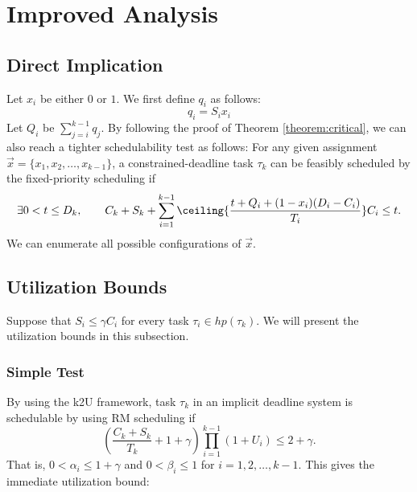 \section{Improved Analysis}

\subsection{Direct Implication}

Let $x_i$ be either $0$ or $1$. We first define $q_i$ as follows:
\begin{equation}
  \label{eq:qi}
  q_i = S_i x_i
\end{equation}
Let $Q_i$ be $\sum_{j=i}^{k-1} q_j$.  
By following the proof of Theorem \ref{theorem:critical}, we can also reach a tighter schedulability test as follows: For any given assignment $\vec{x} = \{x_1, x_2, \ldots, x_{k-1}\}$, a constrained-deadline task $\tau_k$ can be feasibly scheduled by the fixed-priority scheduling if
\begin{equation} \label{eq:TDA-suspension-tighter} 
\exists 0 < t \leq D_k, \qquad C_k+S_k+ \sum_{i=1}^{k-1}\ceiling{\frac{t+Q_i+(1-x_i)(D_i-C_i)}{T_i}} C_i \leq t.
\end{equation}
We can enumerate all possible configurations of $\vec{x}$.
  
\subsection{Utilization Bounds}
Suppose that $S_i \leq \gamma C_i$ for every task $\tau_i \in hp(\tau_k)$. We will present the utilization bounds in this subsection. 

\subsubsection{Simple Test}

By using the k2U framework, task $\tau_k$ in an implicit deadline system is schedulable by using RM scheduling if
\[
(\frac{C_k + S_k}{ T_k}+1+\gamma) \prod_{i=1}^{k-1}(1+U_i) \leq 2+\gamma.
\]
That is, $0 < \alpha_i \leq  1+\gamma$ and $0 < \beta_i \leq 1$ for $i=1,2,\ldots,k-1$.
This gives the immediate utilization bound:
\[

\]
  
  
  
  
  
  
  
  
  
  
  
  
  
  
  